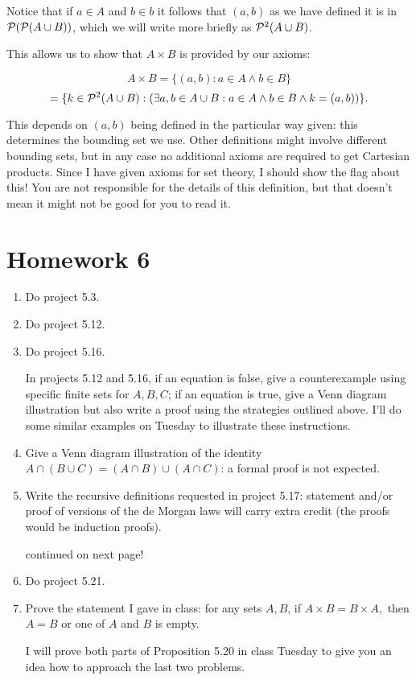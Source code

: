 \documentclass[12pt]{article}
\begin{document}
Notice that if $a \in A$ and $b \in b$ it follows that $(a,b)$ as we have defined it is in ${\cal P}({\cal P}(A \cup B))$, which we will write more briefly as ${\cal P}^2(A \cup B)$.

This allows us to show that $A \times B$ is provided by our axioms:

$$A \times B = \{(a,b):a \in A \wedge b \in B\} $$ $$ = \{k \in {\cal P}^2(A \cup B):(\exists a,b \in A \cup B:a \in A \wedge b \in B \wedge k = (a,b))\}.$$

This depends on $(a,b)$ being defined in the particular way given:  this determines the bounding set we use.  Other definitions might involve different bounding sets, but in any case no additional axioms are required to get Cartesian products.  Since I have given axioms for set theory, I should show the flag about this!  You are not responsible for the details of this definition, but that doesn't mean it might not be good for you to read it.

\section{Homework 6}

\begin{enumerate}

\item Do project 5.3.  

\item Do project 5.12.  

\item Do project 5.16.  

In projects 5.12 and 5.16, if an equation is false, give a counterexample using specific finite sets for $A,B,C$; if an equation is true, give a Venn diagram illustration but also write a proof using the strategies outlined above.  I'll do some similar examples on Tuesday to illustrate these instructions.  

\item Give a Venn diagram illustration of the identity $A \cap (B \cup C) = (A \cap B) \cup (A \cap C)$:  a formal proof is not expected.  

\item Write the recursive definitions requested in project 5.17:  statement and/or proof of versions of the de Morgan laws will carry extra credit (the proofs would be induction proofs).  

continued on next page!

\item Do project 5.21.  

\item  Prove the statement I gave in class:  for any sets $A,B$, if $A \times B = B \times A,$ then $A=B$ or one of $A$ and $B$ is empty.  

I will prove both parts of Proposition 5.20 in class Tuesday to give you an idea how to approach the last two  problems.

\end{enumerate}
\end{document}
